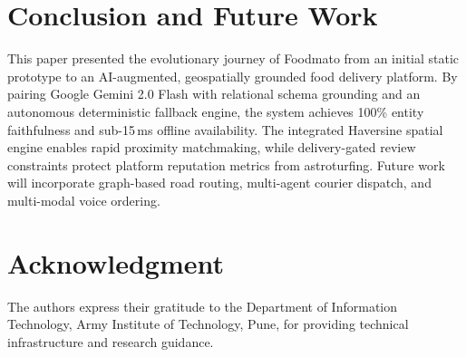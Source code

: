 \documentclass[conference]{IEEEtran}
\begin{document}
\section{Conclusion and Future Work}
This paper presented the evolutionary journey of Foodmato from an initial static prototype to an AI-augmented, geospatially grounded food delivery platform. By pairing Google Gemini 2.0 Flash with relational schema grounding and an autonomous deterministic fallback engine, the system achieves 100\% entity faithfulness and sub-15\,ms offline availability. The integrated Haversine spatial engine enables rapid proximity matchmaking, while delivery-gated review constraints protect platform reputation metrics from astroturfing. Future work will incorporate graph-based road routing, multi-agent courier dispatch, and multi-modal voice ordering.

\section*{Acknowledgment}
The authors express their gratitude to the Department of Information Technology, Army Institute of Technology, Pune, for providing technical infrastructure and research guidance.
\end{document}
